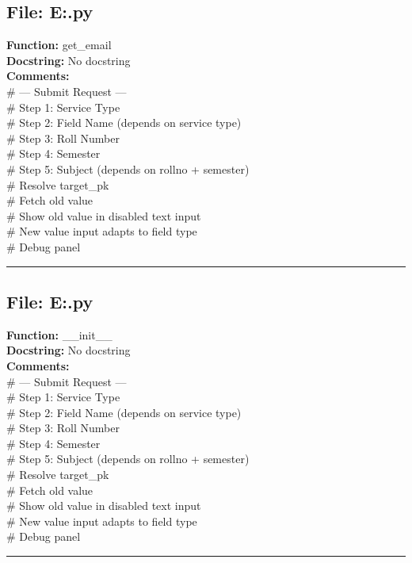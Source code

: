 {\subsection*{File: E:\project\capstone\frontend\faculty\request.py}
\textbf{Function:} get_email\\
\textbf{Docstring:} No docstring\\
\textbf{Comments:}\\
# --- Submit Request ---\\
# Step 1: Service Type\\
# Step 2: Field Name (depends on service type)\\
# Step 3: Roll Number\\
# Step 4: Semester\\
# Step 5: Subject (depends on rollno + semester)\\
# Resolve target\_pk\\
# Fetch old value\\
# Show old value in disabled text input\\
# New value input adapts to field type\\
# Debug panel\\

\hrule

\subsection*{File: E:\project\capstone\frontend\faculty\request.py}
\textbf{Function:} __init__\\
\textbf{Docstring:} No docstring\\
\textbf{Comments:}\\
# --- Submit Request ---\\
# Step 1: Service Type\\
# Step 2: Field Name (depends on service type)\\
# Step 3: Roll Number\\
# Step 4: Semester\\
# Step 5: Subject (depends on rollno + semester)\\
# Resolve target\_pk\\
# Fetch old value\\
# Show old value in disabled text input\\
# New value input adapts to field type\\
# Debug panel\\

\hrule

}
